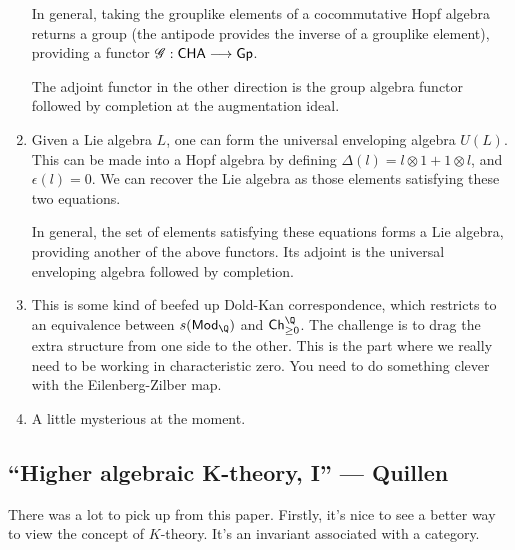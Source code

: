 \documentclass[11pt]{article}
\newcommand{\KanSemResponse}[1]
{
\thispagestyle{fancy}
\subsection*{#1}
}
\begin{document}
\begin{JeremyRationalHomotopyPractice}
\begin{enumerate}
In general, taking the grouplike elements of a cocommutative Hopf algebra returns a group (the antipode provides the inverse of a grouplike element), providing a functor $\mathscr{G}:\mathsf{CHA}\longrightarrow\mathsf{Gp}$.

\INDENT The adjoint functor in the other direction is the group algebra functor followed by completion at the augmentation ideal.
\item Given a Lie algebra $L$, one can form the universal enveloping algebra $U(L)$. This can be made into a Hopf algebra by defining $\Delta(l)=l\otimes1+1\otimes l$, and $\epsilon(l)=0$. We can recover the Lie algebra as those elements satisfying these two equations.

\INDENT In general, the set of elements satisfying these equations forms a Lie algebra, providing another of the above functors. Its adjoint is the universal enveloping algebra followed by completion.
\item This is some kind of beefed up Dold-Kan correspondence, which restricts to an equivalence between $s(\mathsf{Mod}_\Q)$ and $\mathsf{Ch}^{\Q}_{\geq0}$. The challenge is to drag the extra structure from one side to the other. This is the part where we really need to be working in characteristic zero. You need to do something clever with the Eilenberg-Zilber map.
\item A little mysterious at the moment.
\end{enumerate}

\pagebreak
\end{JeremyRationalHomotopyPractice}
\begin{KTheoryQuillen}
\KanSemResponse
{``Higher algebraic K-theory, I'' --- Quillen}
There was a lot to pick up from this paper. Firstly, it's nice to see a better way to view the concept of $K$-theory. It's an invariant associated with a category.

\pagebreak
\end{KTheoryQuillen}
\end{document}
